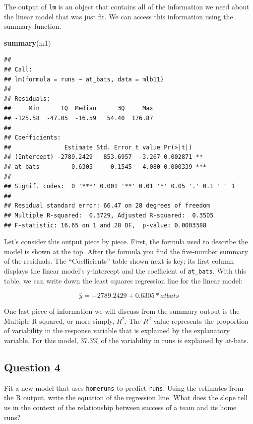 \documentclass[]{article}
\newenvironment{Shaded}{\begin{snugshade}}{\end{snugshade}}
\newcommand{\KeywordTok}[1]{\textcolor[rgb]{0.13,0.29,0.53}{\textbf{#1}}}
\newcommand{\NormalTok}[1]{#1}
\begin{document}
The output of \texttt{lm} is an object that contains all of the
information we need about the linear model that was just fit. We can
access this information using the summary function.

\begin{Shaded}
\begin{Highlighting}[]
\KeywordTok{summary}\NormalTok{(m1)}
\end{Highlighting}
\end{Shaded}

\begin{verbatim}
## 
## Call:
## lm(formula = runs ~ at_bats, data = mlb11)
## 
## Residuals:
##     Min      1Q  Median      3Q     Max 
## -125.58  -47.05  -16.59   54.40  176.87 
## 
## Coefficients:
##               Estimate Std. Error t value Pr(>|t|)    
## (Intercept) -2789.2429   853.6957  -3.267 0.002871 ** 
## at_bats         0.6305     0.1545   4.080 0.000339 ***
## ---
## Signif. codes:  0 '***' 0.001 '**' 0.01 '*' 0.05 '.' 0.1 ' ' 1
## 
## Residual standard error: 66.47 on 28 degrees of freedom
## Multiple R-squared:  0.3729, Adjusted R-squared:  0.3505 
## F-statistic: 16.65 on 1 and 28 DF,  p-value: 0.0003388
\end{verbatim}

Let's consider this output piece by piece. First, the formula used to
describe the model is shown at the top. After the formula you find the
five-number summary of the residuals. The ``Coefficients'' table shown
next is key; its first column displays the linear model's y-intercept
and the coefficient of \texttt{at\_bats}. With this table, we can write
down the least squares regression line for the linear model:

\[
  \hat{y} = -2789.2429 + 0.6305 * atbats
\]

One last piece of information we will discuss from the summary output is
the Multiple R-squared, or more simply, \(R^2\). The \(R^2\) value
represents the proportion of variability in the response variable that
is explained by the explanatory variable. For this model, 37.3\% of the
variability in runs is explained by at-bats.

\subsection{Question 4}\label{question-4}

Fit a new model that uses \texttt{homeruns} to predict \texttt{runs}.
Using the estimates from the R output, write the equation of the
regression line. What does the slope tell us in the context of the
relationship between success of a team and its home runs?
\end{document}
